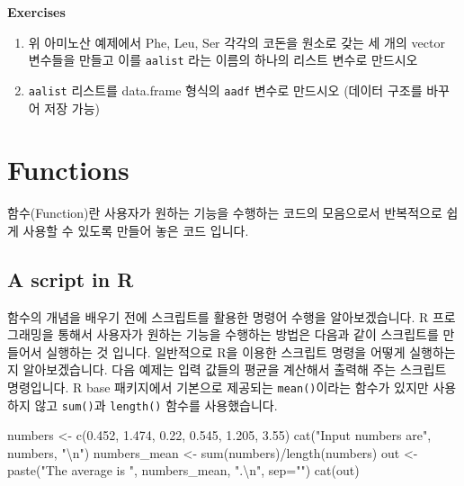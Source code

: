\documentclass[
  a4paper,
]{book}
\newenvironment{Shaded}{\begin{snugshade}}{\end{snugshade}}
\newcommand{\AttributeTok}[1]{\textcolor[rgb]{0.40,0.45,0.13}{#1}}
\newcommand{\FloatTok}[1]{\textcolor[rgb]{0.68,0.00,0.00}{#1}}
\newcommand{\FunctionTok}[1]{\textcolor[rgb]{0.28,0.35,0.67}{#1}}
\newcommand{\NormalTok}[1]{\textcolor[rgb]{0.00,0.23,0.31}{#1}}
\newcommand{\OtherTok}[1]{\textcolor[rgb]{0.00,0.23,0.31}{#1}}
\newcommand{\SpecialCharTok}[1]{\textcolor[rgb]{0.37,0.37,0.37}{#1}}
\newcommand{\StringTok}[1]{\textcolor[rgb]{0.13,0.47,0.30}{#1}}
\begin{document}
\textbf{Exercises}

\begin{enumerate}
\def\labelenumi{\arabic{enumi})}
\item
  위 아미노산 예제에서 Phe, Leu, Ser 각각의 코돈을 원소로 갖는 세 개의
  vector 변수들을 만들고 이를 \texttt{aalist} 라는 이름의 하나의 리스트
  변수로 만드시오
\item
  \texttt{aalist} 리스트를 data.frame 형식의 \texttt{aadf} 변수로
  만드시오 (데이터 구조를 바꾸어 저장 가능)
\end{enumerate}

\hypertarget{functions}{%
\section{Functions}\label{functions}}

함수(Function)란 사용자가 원하는 기능을 수행하는 코드의 모음으로서
반복적으로 쉽게 사용할 수 있도록 만들어 놓은 코드 입니다.

\hypertarget{a-script-in-r}{%
\subsection{A script in R}\label{a-script-in-r}}

함수의 개념을 배우기 전에 스크립트를 활용한 명령어 수행을
알아보겠습니다. R 프로그래밍을 통해서 사용자가 원하는 기능을 수행하는
방법은 다음과 같이 스크립트를 만들어서 실행하는 것 입니다. 일반적으로
R을 이용한 스크립트 명령을 어떻게 실행하는지 알아보겠습니다. 다음 예제는
입력 값들의 평균을 계산해서 출력해 주는 스크립트 명령입니다. R base
패키지에서 기본으로 제공되는 \texttt{mean()}이라는 함수가 있지만
사용하지 않고 \texttt{sum()}과 \texttt{length()} 함수를 사용했습니다.

\begin{Shaded}
\begin{Highlighting}[]
\NormalTok{numbers }\OtherTok{\textless{}{-}} \FunctionTok{c}\NormalTok{(}\FloatTok{0.452}\NormalTok{, }\FloatTok{1.474}\NormalTok{, }\FloatTok{0.22}\NormalTok{, }\FloatTok{0.545}\NormalTok{, }\FloatTok{1.205}\NormalTok{, }\FloatTok{3.55}\NormalTok{)}
\FunctionTok{cat}\NormalTok{(}\StringTok{"Input numbers are"}\NormalTok{, numbers, }\StringTok{"}\SpecialCharTok{\textbackslash{}n}\StringTok{"}\NormalTok{)}
\NormalTok{numbers\_mean }\OtherTok{\textless{}{-}} \FunctionTok{sum}\NormalTok{(numbers)}\SpecialCharTok{/}\FunctionTok{length}\NormalTok{(numbers)}
\NormalTok{out }\OtherTok{\textless{}{-}} \FunctionTok{paste}\NormalTok{(}\StringTok{"The average is "}\NormalTok{, numbers\_mean, }\StringTok{".}\SpecialCharTok{\textbackslash{}n}\StringTok{"}\NormalTok{, }\AttributeTok{sep=}\StringTok{""}\NormalTok{)}
\FunctionTok{cat}\NormalTok{(out)}
\end{Highlighting}
\end{Shaded}
\end{document}
